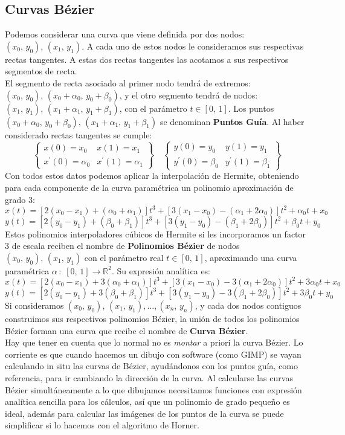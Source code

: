\documentclass[12pt,a4paper,oneside]{scrbook}
\newcounter{ns}
\begin{document}
\subsection*{Curvas Bézier}
Podemos considerar una curva que viene definida por dos nodos: $(x_0,\,y_0),\,(x_1,\,y_1)$. A cada uno de estos nodos le consideramos sus respectivas rectas tangentes. A estas dos rectas tangentes las acotamos a sus respectivos segmentos de recta.\\
El segmento de recta asociado al primer nodo tendrá de extremos: $(x_0,\,y_0),\,(x_0+\alpha_0,\,y_0+\beta_0)$, y el otro segmento tendrá de nodos: $(x_1,\,y_1),\,(x_1+\alpha_1,\,y_1+\beta_1)$, con el parámetro $t\in [0,\,1]$. Los puntos $(x_0+\alpha_0,\,y_0+\beta_0),\,(x_1+\alpha_1,\,y_1+\beta_1)$ se denominan \textbf{Puntos Guía}. Al haber considerado rectas tangentes se cumple:
\[
\begin{Bmatrix}
x(0)=x_0 & x(1)=x_1\\
x^\prime (0)=\alpha_0 & x^\prime (1)=\alpha_1
\end{Bmatrix}\quad
\begin{Bmatrix}
y(0)=y_0 & y(1)=y_1\\
y^\prime (0)=\beta_0 & y^\prime (1)=\beta_1
\end{Bmatrix}
\]
Con todos estos datos podemos aplicar la interpolación de Hermite, obteniendo para cada componente de la curva paramétrica un polinomio aproximación de grado 3:
\[
x(t)=[2(x_0-x_1)+(\alpha_0 +\alpha_1)]t^3+[3(x_1-x_0)-(\alpha_1 +2\alpha_0)]t^2+\alpha_0 t+x_0
\]
\[
y(t)=[2(y_0-y_1)+(\beta_0 +\beta_1)]t^3+[3(y_1-y_0)-(\beta_1 +2\beta_0)]t^2+\beta_0 t+y_0
\]
Estos polinomios interpoladores cúbicos de Hermite si les incorporamos un factor 3 de escala reciben el nombre de \textbf{Polinomios Bézier} de nodos $(x_0,\,y_0),\,(x_1,\,y_1)$ con el parámetro real $t\in [0,\,1]$, aproximando una curva paramétrica $\alpha\,:\;[0,\,1]\longrightarrow \mathbb{R}^2$. Su expresión analítica es:
\[
x(t)=[2(x_0-x_1)+3(\alpha_0 +\alpha_1)]t^3+[3(x_1-x_0)-3(\alpha_1 +2\alpha_0)]t^2+3\alpha_0 t+x_0
\]
\[
y(t)=[2(y_0-y_1)+3(\beta_0 +\beta_1)]t^3+[3(y_1-y_0)-3(\beta_1 +2\beta_0)]t^2+3\beta_0 t+y_0
\]
Si consideramos $(x_0,\,y_0),\,(x_1,\,y_1),\dots ,(x_n,\,y_n)$, y cada dos nodos contiguos construimos sus respectivos polinomios Bézier, la unión de todos los polinomios Bézier forman una curva que recibe el nombre de \textbf{Curva Bézier}.\\
Hay que tener en cuenta que lo normal no es \textit{montar} a priori la curva Bézier. Lo corriente es que cuando hacemos un dibujo con software (como GIMP) se vayan calculando in situ las curvas de Bézier, ayudándonos con los puntos guía, como referencia, para ir cambiando la dirección de la curva. Al calcularse las curvas Bézier simultáneamente a lo que dibujamos necesitamos funciones con expresión analítica sencilla para los cálculos, así que un polinomio de grado pequeño es ideal, además para calcular las imágenes de los puntos de la curva se puede simplificar si lo hacemos con el algoritmo de Horner.
\end{document}
